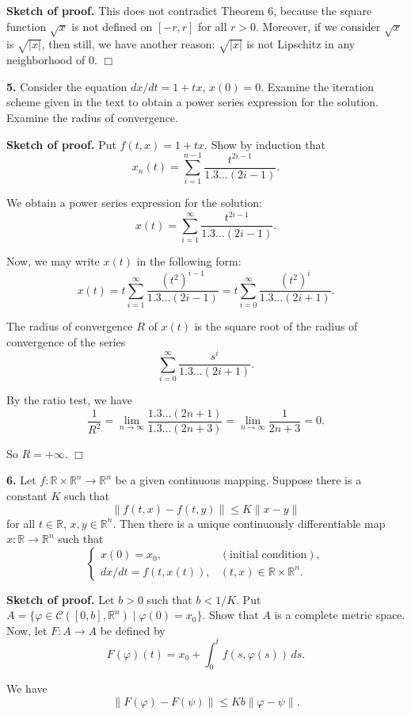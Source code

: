 \documentclass{article}
\begin{document}
    \textbf{Sketch of proof.} This does not contradict Theorem 6, because
the square function $\sqrt{x}$ is not defined on $[-r, r]$ for all
$r > 0$. Moreover, if we consider $\sqrt{x}$ is $\sqrt{|x|}$, then
still, we have another reason: $\sqrt{|x|}$ is not Lipschitz in any
neighborhood of $0$. $\Box$

    \textbf{5.} Consider the equation $dx/dt = 1 + tx$, $x(0) = 0$. Examine
the iteration scheme given in the text to obtain a power series
expression for the solution. Examine the radius of convergence.

    \textbf{Sketch of proof.} Put $f(t,x) = 1 + tx$. Show by induction that
\[x_n(t) = \sum_{i = 1}^{n-1} \frac{t^{2i-1}}{1.3\ldots  (2i-1)}.\]

We obtain a power series expression for the solution:
\[x(t) = \sum_{i = 1}^{\infty} \frac{t^{2i-1}}{1.3\ldots (2i-1)}.\]

Now, we may write $x(t)$ in the following form:
\[x(t) = t\sum_{i = 1}^{\infty} \frac{(t^2)^{i-1}}{1.3\ldots (2i-1)} = t \sum_{i = 0}^{\infty} \frac{(t^2)^i}{1.3\ldots (2i+1)}.\]

The radius of convergence $R$ of $x(t)$ is the square root of the radius
of convergence of the series \[
\sum_{i=0}^{\infty} \frac{s^i}{1.3\ldots (2i+1)}.
\]

By the ratio test, we have
\[\frac{1}{R^2} = \lim_{n\to \infty} \frac{{1.3\ldots  (2n+1)}}{1.3\ldots  (2n+3)} = \lim_{n\to\infty} \frac{1}{2n+3}= 0.\]

So $R = +\infty$. $\Box$

    \textbf{6.} Let $f : \mathbb{R} \times \mathbb{R}^n \to \mathbb{R}^n$ be
a given continuous mapping. Suppose there is a constant $K$ such that
\[\|f (t, x) − f (t, y)\| ≤ K \| x − y\|\] for all $t \in \mathbb{R}$,
$x, y \in \mathbb{R}^n$. Then there is a unique continuously
differentiable map $x : \mathbb{R} \to \mathbb{R}^n$ such that
\[\begin{cases}
x(0) = x_0, & (\text{initial condition}),\\
dx/dt = f(t,x(t)), & (t,x) \in \mathbb{R} \times \mathbb{R}^n.
\end{cases}\]

    \textbf{Sketch of proof.} Let $b > 0$ such that $b < 1/K$. Put
$A = \{\varphi \in \mathcal{C}([0,b], \mathbb{R}^n) \mid \varphi(0) = x_0\}$.
Show that $A$ is a complete metric space. Now, let $F :A \to A$ be
defined by \[ F(\varphi) (t) = x_0 + \int_0^t f(s, \varphi(s))\, ds.\]

We have \[\|F(\varphi) - F(\psi)\| \le Kb \|\varphi -\psi\|.\]
\end{document}
